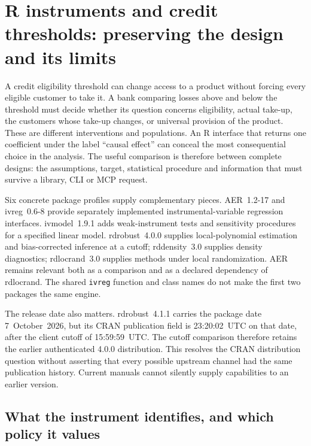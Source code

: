 \section{R instruments and credit thresholds: preserving the design and its limits}
\label{exec22:riv-scope}

A credit eligibility threshold can change access to a product without forcing
every eligible customer to take it. A bank comparing losses above and below the
threshold must decide whether its question concerns eligibility, actual take-up,
the customers whose take-up changes, or universal provision of the product. These
are different interventions and populations. An R interface that returns one
coefficient under the label ``causal effect'' can conceal the most consequential
choice in the analysis. The useful comparison is therefore between complete
designs: the assumptions, target, statistical procedure and information that must
survive a library, CLI or MCP request.

Six concrete package profiles supply complementary pieces. AER~1.2-17 and
ivreg~0.6-8 provide separately implemented instrumental-variable regression
interfaces. ivmodel~1.9.1 adds weak-instrument tests and sensitivity procedures
for a specified linear model. rdrobust~4.0.0 supplies local-polynomial estimation
and bias-corrected inference at a cutoff; rddensity~3.0 supplies density diagnostics;
rdlocrand~3.0 supplies methods under local randomization. AER remains relevant
both as a comparison and as a declared dependency of rdlocrand. The shared
\texttt{ivreg} function and class names do not make the first two packages the
same engine.~\citep{exec22_riv_aer,exec22_riv_ivreg,exec22_riv_ivmodel,
exec22_riv_rdrobust,exec22_riv_rddensity,exec22_riv_rdlocrand}

The release date also matters. rdrobust~4.1.1 carries the package date
7~October~2026, but its CRAN publication field is 23:20:02~UTC on that date,
after the client cutoff of 15:59:59~UTC. The cutoff comparison therefore retains
the earlier authenticated 4.0.0 distribution. This resolves the CRAN distribution
question without asserting that every possible upstream channel had the same
publication history. Current manuals cannot silently supply capabilities to an
earlier version.~\citep{exec22_riv_rdrobust}

\subsection{What the instrument identifies, and which policy it values}
\label{exec22:riv-target}

